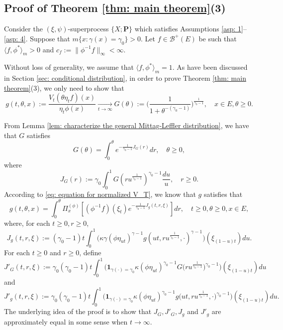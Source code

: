 \documentclass[12pt, a4paper]{amsart}
\theoremstyle{definition}
\numberwithin{equation}{section}
\begin{document}
\subsection{Proof of Theorem \ref{thm: main theorem}(3)}
\label{sec: proof of result 3}
	Consider the $(\xi, \psi)$-superprocess $\{X;\mathbf P\}$ which satisfies
	Assumptions \ref{asp: 1}--\ref{asp: 4}.
	Suppose that $m\{ x:\gamma(x)=\gamma_0 \}>0$.
	Let $f \in \mathscr B^+(E)$ be  such that $ \langle f, \phi^* \rangle_m > 0$  and $c_f:=\| \phi^{-1}f \|_\infty < \infty$.
	
	Without loss of generality, we assume that $\langle f, \phi^* \rangle_m = 1$.
	As have been discussed in Section \ref{sec: conditional distribution},
	in order to prove Theorem \ref{thm: main theorem}(3), we only need to show that
\[
	g(t,\theta,x)
	:=\frac{V_t (\theta \eta_t f) (x)}{\eta_t \phi(x)}
	\xrightarrow[t\to \infty]{} G(\theta)
	:= \Big( \frac{1}{1+\theta^{-(\gamma_0 - 1)}} \Big)^{ \frac{1}{\gamma_0 - 1} },
	\quad x\in E, \theta \geq 0.
\]
		
	From Lemma \ref{lem: characterize the general Mittag-Leffler distribution},
we have that $G$ satisfies
\[\label{eq: equation for G}
	G(\theta)
	= \int_0^\theta e^{ - \frac{1} {\gamma_0 - 1} J_G(r)} dr,
	\quad \theta \geq 0,
\]
	where
\[\label{eq: definition for J_G}
	J_G(r):=
	\gamma_0 \int_0^1 G(ru^{\frac{1}{\gamma_0 - 1}}) ^{\gamma_0 - 1}\frac{du}{u},
	\quad r\geq 0 .
\]
	According to \eqref{eq: equation for normalized V_T},
  we know that $g$ satisfies that
\[\label{eq: equation for g}
	g(t,\theta, x)= \int_0^{\theta} \Pi_x^{(\phi)} [ (\phi^{-1}f)(\xi_t) e^{-\frac{1}{\gamma_0 - 1} J_g(t,r,\xi) } ] dr,
	\quad t\geq 0, \theta \geq 0, x\in E,
\]
	where, for each $t\geq 0, r\geq 0$,
\[\label{eq: definition for J_g}
	J_g(t,r,\xi):=
	(\gamma_0 - 1)t\int_0^1 \big(  \kappa\gamma (   \phi \eta_{ut}  )^{\gamma - 1} g (ut,ru^{\frac{1}{\gamma_0 - 1}},\cdot )^{\gamma-1}  \big) (  \xi_{(1-u)t}  ) du.
\]
	For each $t\geq 0$ and $r\geq 0$, define
\[\label{eq: definition of J'_G}
	J'_G(t,r,\xi):=
	\gamma_0 (\gamma_0 - 1) t \int_0^1 \big( \mathbf 1_{\gamma(\cdot) = \gamma_0} \kappa (\phi \eta_{ut})^{\gamma_0 - 1} G\big( ru^{\frac{1}{\gamma_0 - 1}} \big) ^{\gamma_0 - 1} \big) (\xi_{(1-u)t}) du
\]
	and
\[\label{eq: definition of J'_g}
	J'_g(t,r,\xi):=
	\gamma_0 (\gamma_0 - 1) t \int_0^1 \big( \mathbf 1_{\gamma(\cdot) = \gamma_0} \kappa (\phi \eta_{ut})^{\gamma_0 - 1} g\big( ut,ru^{\frac{1}{\gamma_0 - 1}}, \cdot \big)^{\gamma_0 - 1}  \big) (\xi_{(1-u)t})  du.
\]
	The underlying idea of the proof is to show that $J_G,J'_G,J_g$ and $J'_g$ are approximately equal in some sense when $t\to \infty$.
	
\end{document}
